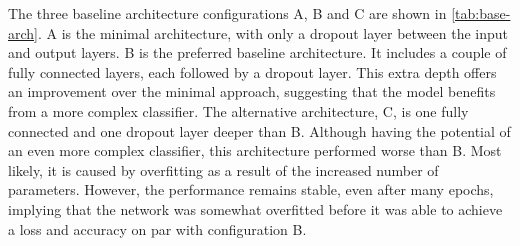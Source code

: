 The three baseline architecture configurations A, B and C are shown in \autoref{tab:base-arch}. A is the minimal architecture, with only a dropout layer between the input and output layers. B is the preferred baseline architecture. It includes a couple of fully connected layers, each followed by a dropout layer. This extra depth offers an improvement over the minimal approach, suggesting that the model benefits from a more complex classifier. The alternative architecture, C, is one fully connected and one dropout layer deeper than B. Although having the potential of an even more complex classifier, this architecture performed worse than B. Most likely, it is caused by overfitting as a result of the increased number of parameters. However, the performance remains stable, even after many epochs, implying that the network was somewhat overfitted before it was able to achieve a loss and accuracy on par with configuration B.

